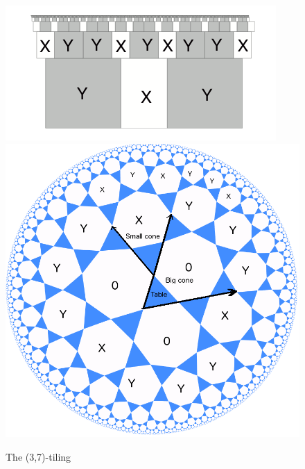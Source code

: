 \documentclass[11pt, oneside]{article}   	%
\begin{document}
\begin{figure}
\includegraphics[scale=0.6]{crochetnew37.png}
\includegraphics[scale=0.3]{37finalpicture1.png}
\caption{The (3,7)-tiling}
\label{37tiling}
\end{figure}
\end{document}
